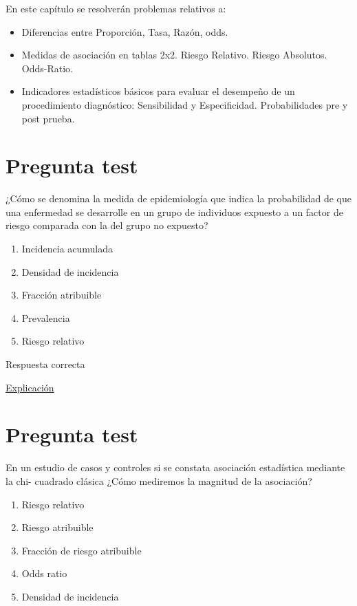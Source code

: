 \documentclass[
]{book}
\providecommand{\tightlist}{%
  \setlength{\itemsep}{0pt}\setlength{\parskip}{0pt}}
\begin{document}
En este capítulo se resolverán problemas relativos a:

\begin{itemize}
\tightlist
\item
  Diferencias entre Proporción, Tasa, Razón, odds.
\item
  Medidas de asociación en tablas 2x2. Riesgo Relativo. Riesgo Absolutos. Odds-Ratio.
\item
  Indicadores estadísticos básicos para evaluar el desempeño de un procedimiento diagnóstico: Sensibilidad y Especificidad. Probabilidades pre y post prueba.
\end{itemize}

\hypertarget{pregunta-test-106}{%
\section{Pregunta test}\label{pregunta-test-106}}

¿Cómo se denomina la medida de epidemiología que indica la probabilidad de que una enfermedad se desarrolle en un grupo de individuos expuesto a un factor de riesgo comparada con la del grupo no expuesto?

\begin{enumerate}
\def\labelenumi{\alph{enumi})}
\tightlist
\item
  Incidencia acumulada
\item
  Densidad de incidencia
\item
  Fracción atribuible
\item
  Prevalencia
\item
  Riesgo relativo
\end{enumerate}

Respuesta correcta

\href{https://es.wikipedia.org/wiki/Riesgo_relativo}{Explicación}

\hypertarget{pregunta-test-107}{%
\section{Pregunta test}\label{pregunta-test-107}}

En un estudio de casos y controles si se constata asociación estadística mediante la chi- cuadrado clásica ¿Cómo mediremos la magnitud de la asociación?

\begin{enumerate}
\def\labelenumi{\alph{enumi})}
\tightlist
\item
  Riesgo relativo
\item
  Riesgo atribuible
\item
  Fracción de riesgo atribuible
\item
  Odds ratio
\item
  Densidad de incidencia
\end{enumerate}
\end{document}
